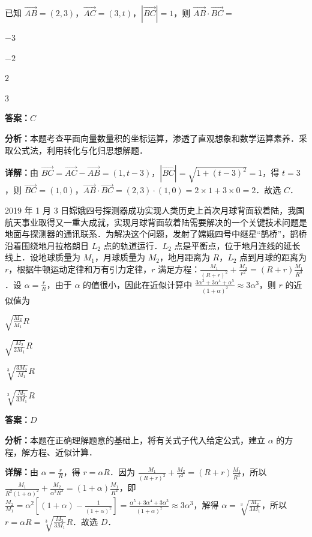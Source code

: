 \begin{question}[points=5]
已知 $\overrightarrow{AB}=(2,3)$，$\overrightarrow{AC}=(3,t)$，$|\overrightarrow{BC}|=1$，则 $\overrightarrow{AB}\cdot\overrightarrow{BC}=$
\begin{choices}
  \item $-3$
  \item $-2$
  \item $2$
  \item $3$
\end{choices}
\begin{solution}
\textbf{答案：}$C$

\textbf{分析：}本题考查平面向量数量积的坐标运算，渗透了直观想象和数学运算素养．采取公式法，利用转化与化归思想解题．

\textbf{详解：}由 $\overrightarrow{BC}=\overrightarrow{AC}-\overrightarrow{AB}=(1,t-3)$，$|\overrightarrow{BC}|=\sqrt{1+(t-3)^2}=1$，得 $t=3$，则 $\overrightarrow{BC}=(1,0)$，$\overrightarrow{AB}\cdot\overrightarrow{BC}=(2,3)\cdot(1,0)=2\times1+3\times0=2$．故选 $C$．
\end{solution}
\end{question}

\begin{question}[points=5]
2019 年 1 月 3 日嫦娥四号探测器成功实现人类历史上首次月球背面软着陆，我国航天事业取得又一重大成就，实现月球背面软着陆需要解决的一个关键技术问题是地面与探测器的通讯联系．为解决这个问题，发射了嫦娥四号中继星“鹊桥”，鹊桥沿着围绕地月拉格朗日 $L_2$ 点的轨道运行．$L_2$ 点是平衡点，位于地月连线的延长线上．设地球质量为 $M_1$，月球质量为 $M_2$，地月距离为 $R$，$L_2$ 点到月球的距离为 $r$，根据牛顿运动定律和万有引力定律，$r$ 满足方程：$\frac{M_1}{(R+r)^2}+\frac{M_2}{r^2}=(R+r)\frac{M_1}{R^3}$．设 $\alpha=\frac{r}{R}$，由于 $\alpha$ 的值很小，因此在近似计算中 $\frac{3\alpha^3+3\alpha^4+\alpha^5}{(1+\alpha)^2}\approx 3\alpha^3$，则 $r$ 的近似值为
\begin{choices}
  \item $\sqrt{\frac{M_2}{M_1}}R$
  \item $\sqrt{\frac{M_2}{2M_1}}R$
  \item $\sqrt[3]{\frac{3M_2}{M_1}}R$
  \item $\sqrt[3]{\frac{M_2}{3M_1}}R$
\end{choices}
\begin{solution}
\textbf{答案：}$D$

\textbf{分析：}本题在正确理解题意的基础上，将有关式子代入给定公式，建立 $\alpha$ 的方程，解方程、近似计算．

\textbf{详解：}由 $\alpha=\frac{r}{R}$，得 $r=\alpha R$．因为 $\frac{M_1}{(R+r)^2}+\frac{M_2}{r^2}=(R+r)\frac{M_1}{R^3}$，所以 $\frac{M_1}{R^2(1+\alpha)^2}+\frac{M_2}{\alpha^2 R^2}=(1+\alpha)\frac{M_1}{R^2}$，即 $\frac{M_2}{M_1}=\alpha^2[(1+\alpha)-\frac{1}{(1+\alpha)^2}]=\frac{\alpha^5+3\alpha^4+3\alpha^3}{(1+\alpha)^2}\approx 3\alpha^3$，解得 $\alpha=\sqrt[3]{\frac{M_2}{3M_1}}$，所以 $r=\alpha R=\sqrt[3]{\frac{M_2}{3M_1}}R$．故选 $D$．
\end{solution}
\end{question}

